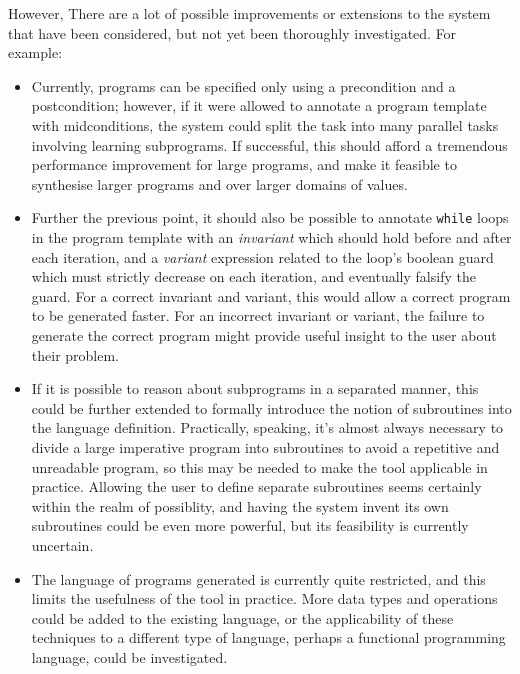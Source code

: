 \documentclass[a4paper,twoside,notitlepage]{report}
\begin{document}
However, There are a lot of possible improvements or extensions to the system that have 
been considered, but not yet been thoroughly investigated. For example:

\begin{itemize}
    \item Currently, programs can be specified only using a precondition and a 
    postcondition; however, if it were allowed to annotate a program template with 
    midconditions, the system could split the task into many parallel tasks involving 
    learning subprograms. If successful, this should afford a tremendous performance 
    improvement for large programs, and make it feasible to synthesise larger programs 
    and over larger domains of values.
    
    \item Further the previous point, it should also be possible to annotate 
    \verb|while| loops in the program template with an \emph{invariant} which should 
    hold before and after each iteration, and a \emph{variant} expression related to 
    the loop's boolean guard which must strictly decrease on each iteration, and 
    eventually falsify the guard. For a correct invariant and variant, this would allow 
    a correct program to be generated faster. For an incorrect invariant or variant, 
    the failure to generate the correct program might provide useful insight to the 
    user about their problem.

    \item If it is possible to reason about subprograms in a separated manner, this 
    could be further extended to formally introduce the notion of subroutines into the 
    language definition. Practically, speaking, it's almost always necessary to divide 
    a large imperative program into subroutines to avoid a repetitive and unreadable 
    program, so this may be needed to make the tool applicable in practice. Allowing 
    the user to define separate subroutines seems certainly within the realm of 
    possiblity, and having the system invent its own subroutines could be even more 
    powerful, but its feasibility is currently uncertain.
    
    \item The language of programs generated is currently quite restricted, and this 
    limits the usefulness of the tool in practice. More data types and operations could 
    be added to the existing language, or the applicability of these techniques to a 
    different type of language, perhaps a functional programming language, could be 
    investigated.


\end{itemize}
\end{document}
